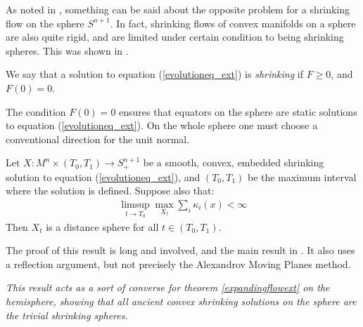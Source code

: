 As noted in \cite{summary}, something can be said about the opposite problem for a shrinking flow on the sphere $S^{n+1}$. In fact, shrinking flows of convex manifolds on a sphere are also quite rigid, and are limited under certain condition to being shrinking spheres. This was shown in \cite{BryanIvakiScheuer}. 

\begin{defin}
	We say that a solution to equation (\ref{evolutioneq_ext}) is {\em shrinking} if $F\geq 0$, and $F(0)=0$. 
\end{defin}
The condition $F(0)=0$ ensures that equators on the sphere are static solutions to equation (\ref{evolutioneq_ext}). On the whole sphere one must choose a conventional direction for the unit normal. 


\begin{theorem}
	Let $ X : M^n \times (T_0, T_1) \to S^{n+1}_+ $ be a smooth, convex, embedded shrinking solution to equation (\ref{evolutioneq_ext}), and $ (T_0, T_1)$ be the maximum interval where the solution is defined. Suppose also that:
	\begin{align*}
		\limsup_{t\rightarrow T_0} \max_{X_t} \sum_i \kappa_i(x)<\infty
	\end{align*}
	Then $X_t$ is a distance sphere for all $t\in  (T_0, T_1)$.
\end{theorem}

The proof of this result is long and involved, and the main result in \cite{BryanIvakiScheuer}. It also uses a reflection argument, but not precisely the Alexandrov Moving Planes method. 
\begin{oss}
	\em
	This result acts as a sort of converse for theorem \ref{expandingflowext} on the hemisphere, showing that all ancient convex shrinking solutions on the sphere are the trivial shrinking spheres. 
\end{oss}
